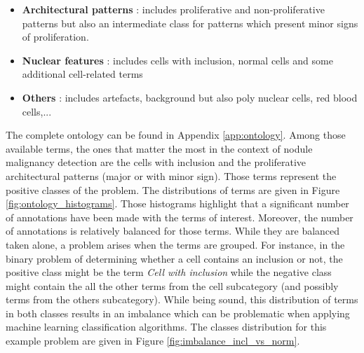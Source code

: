 \begin{itemize}
	\item \textbf{Architectural patterns} : includes proliferative and non-proliferative patterns but also an intermediate class for patterns which present minor signs of proliferation.
	\item \textbf{Nuclear features} : includes cells with inclusion, normal cells and some additional cell-related terms
	\item \textbf{Others} : includes artefacts, background but also poly nuclear cells, red blood cells,...
\end{itemize} 

The complete ontology can be found in Appendix \ref{app:ontology}. Among those available terms, the ones that matter the most in the context of nodule malignancy detection are the cells with inclusion and the proliferative architectural patterns (major or with minor sign). Those terms represent the positive classes of the problem. The distributions of terms are given in Figure \ref{fig:ontology_histograms}. Those histograms highlight that a significant number of annotations have been made with the terms of interest. Moreover, the number of annotations is relatively balanced for those terms. While they are balanced taken alone, a problem arises when the terms are grouped. For instance, in the binary problem of determining whether a cell contains an inclusion or not, the positive class might be the term \textit{Cell with inclusion} while the negative class might contain the all the other terms from the cell subcategory (and possibly terms from the others subcategory). While being sound, this distribution of terms in both classes results in an imbalance which can be problematic when applying machine learning classification algorithms. The classes distribution for this example problem are given in Figure \ref{fig:imbalance_incl_vs_norm}.


